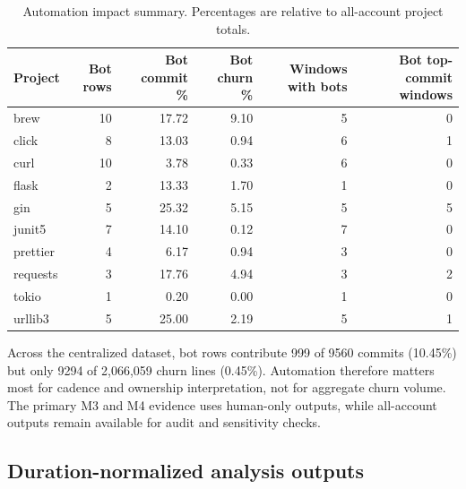 \begin{table}[H]
\centering
\scriptsize
\renewcommand{\arraystretch}{1.12}
\begin{tabular}{lrrrrr}
\toprule
\textbf{Project} & \textbf{Bot rows} & \textbf{Bot commit \%} & \textbf{Bot churn \%} & \textbf{Windows with bots} & \textbf{Bot top-commit windows} \\
\midrule
brew     & 10 & 17.72 & 9.10 & 5 & 0 \\
click    & 8  & 13.03 & 0.94 & 6 & 1 \\
curl     & 10 & 3.78  & 0.33 & 6 & 0 \\
flask    & 2  & 13.33 & 1.70 & 1 & 0 \\
gin      & 5  & 25.32 & 5.15 & 5 & 5 \\
junit5   & 7  & 14.10 & 0.12 & 7 & 0 \\
prettier & 4  & 6.17  & 0.94 & 3 & 0 \\
requests & 3  & 17.76 & 4.94 & 3 & 2 \\
tokio    & 1  & 0.20  & 0.00 & 1 & 0 \\
urllib3  & 5  & 25.00 & 2.19 & 5 & 1 \\
\bottomrule
\end{tabular}
\caption{Automation impact summary. Percentages are relative to all-account project totals.}
\label{tab:bot_impact_summary}
\end{table}

Across the centralized dataset, bot rows contribute 999 of 9560 commits (10.45\%) but only
9294 of 2{,}066{,}059 churn lines (0.45\%). Automation therefore matters most for cadence
and ownership interpretation, not for aggregate churn volume. The primary M3 and M4 evidence
uses human-only outputs, while all-account outputs remain available for audit and sensitivity checks.

\subsection{Duration-normalized analysis outputs}
\label{sec:duration_normalized_outputs}

